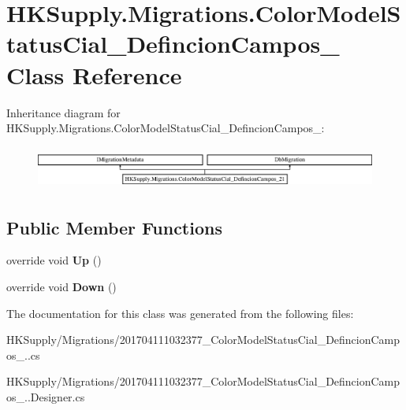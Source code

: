\hypertarget{class_h_k_supply_1_1_migrations_1_1_color_model_status_cial___defincion_campos__21}{}\section{H\+K\+Supply.\+Migrations.\+Color\+Model\+Status\+Cial\+\_\+\+Defincion\+Campos\+\_ Class Reference}
\label{class_h_k_supply_1_1_migrations_1_1_color_model_status_cial___defincion_campos__21}
Inheritance diagram for H\+K\+Supply.\+Migrations.\+Color\+Model\+Status\+Cial\+\_\+\+Defincion\+Campos\+\_\+:\begin{figure}[H]
\begin{center}
\leavevmode
\includegraphics[height=1.428571cm]{class_h_k_supply_1_1_migrations_1_1_color_model_status_cial___defincion_campos__21}
\end{center}
\end{figure}
\subsection*{Public Member Functions}
\begin{DoxyCompactItemize}
\item 
\mbox{\label{class_h_k_supply_1_1_migrations_1_1_color_model_status_cial___defincion_campos__21_a6a78412454529c5c584f0767118d60cc}} 
override void {\bfseries Up} ()
\item 
\mbox{\label{class_h_k_supply_1_1_migrations_1_1_color_model_status_cial___defincion_campos__21_adee235231656d85df54bb31080d52387}} 
override void {\bfseries Down} ()
\end{DoxyCompactItemize}


The documentation for this class was generated from the following files\+:\begin{DoxyCompactItemize}
\item 
H\+K\+Supply/\+Migrations/201704111032377\+\_\+\+Color\+Model\+Status\+Cial\+\_\+\+Defincion\+Campos\+\_..\+cs\item 
H\+K\+Supply/\+Migrations/201704111032377\+\_\+\+Color\+Model\+Status\+Cial\+\_\+\+Defincion\+Campos\+\_..\+Designer.\+cs\end{DoxyCompactItemize}
